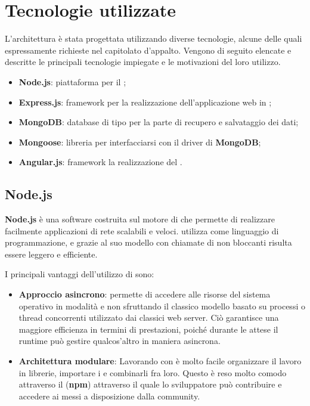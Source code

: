 \section{Tecnologie utilizzate}


L'architettura è stata progettata utilizzando diverse tecnologie, alcune delle quali espressamente richieste nel capitolato d'appalto. Vengono di seguito elencate e descritte le principali tecnologie impiegate e le motivazioni del loro utilizzo.

\begin{itemize}
	\item \textbf{Node.js}: piattaforma per il ;
	\item \textbf{Express.js}: framework per la realizzazione dell’applicazione web in ;
	\item \textbf{MongoDB}: database di tipo  per la parte di recupero e salvataggio dei dati;
	\item \textbf{Mongoose}: libreria per interfacciarsi con il driver di \textbf{MongoDB};
	\item \textbf{Angular.js}: framework  la realizzazione del .
\end{itemize}

\subsection{Node.js}
\textbf{Node.js} è una  software costruita sul motore  di  che permette di realizzare facilmente applicazioni di rete scalabili e veloci.  utilizza  come linguaggio di programmazione, e grazie al suo modello  con chiamate di  non bloccanti risulta essere leggero e efficiente.

I principali vantaggi dell'utilizzo di  sono:
\begin{itemize}
	\item \textbf{Approccio asincrono}:  permette di accedere alle risorse del sistema operativo in modalità  e non sfruttando il classico modello basato su processi o thread concorrenti utilizzato dai classici web server. Ciò garantisce una maggiore efficienza in termini di prestazioni, poiché durante le attese il runtime può gestire qualcos'altro in maniera asincrona.
	\item \textbf{Architettura modulare}: Lavorando con  è molto facile organizzare il lavoro in librerie, importare i  e combinarli fra loro. Questo è reso molto comodo attraverso il  (\textbf{npm}) attraverso il quale lo sviluppatore può contribuire e accedere ai  messi a disposizione dalla community.
\end{itemize}

